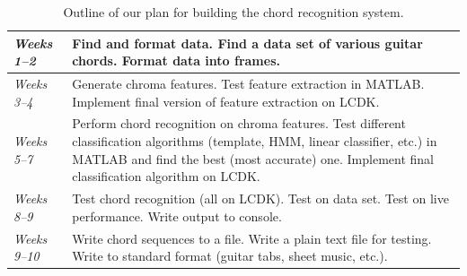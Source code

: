 \documentclass[journal]{IEEEtran}
\begin{document}
\def\arraystretch{1.5}
\begin{table}[ht]
    \centering
    \caption{Outline of our plan for building the chord recognition system.}
    \begin{tabularx}{0.95\linewidth}{|>{\hsize=0.4\hsize}X|>{\hsize=1.6\hsize}X|}
        \hline
            \textit{Weeks 1--2}
            &
            Find and format data.
            Find a data set of various guitar chords.
            Format data into frames. \\
        \hline
            \textit{Weeks 3--4}
            &
            Generate chroma features.
            Test feature extraction in MATLAB.
            Implement final version of feature extraction on LCDK. \\
        \hline
            \textit{Weeks 5--7}
            &
            Perform chord recognition on chroma features.
            Test different classification algorithms (template, HMM, linear classifier, etc.) in MATLAB and find the best (most accurate) one.
            Implement final classification algorithm on LCDK.\\
        \hline
            \textit{Weeks 8--9}
            &
            Test chord recognition (all on LCDK).
            Test on data set.
            Test on live performance.
            Write output to console.\\
        \hline
            \textit{Weeks 9--10}
            &
            Write chord sequences to a file.
            Write a plain text file for testing.
            Write to standard format (guitar tabs, sheet music, etc.).\\
        \hline
    \end{tabularx}
    \label{tab:plan}
\end{table}
\end{document}
